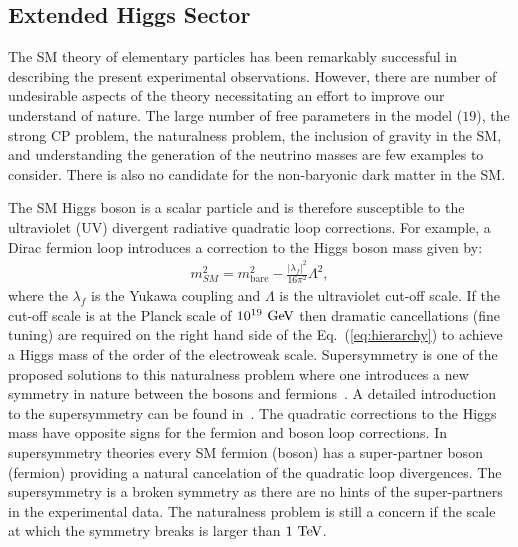 \subsection{Extended Higgs Sector}

The SM theory of elementary particles has been remarkably successful in describing the present experimental observations. However, there are number of undesirable aspects of the theory necessitating an effort to improve our understand of nature. The large number of free parameters in the model ($19$), the strong CP problem, the naturalness problem, the inclusion of gravity in the SM, and understanding the generation of the neutrino masses are few examples to consider. There is also no candidate for the non-baryonic dark matter in the SM. 

The SM Higgs boson is a scalar particle and is therefore susceptible to the ultraviolet (UV) divergent radiative quadratic loop corrections. For example, a Dirac fermion loop introduces a correction to the Higgs boson mass given by:
\begin{eqnarray} \label{eq:hierarchy}
m^{2}_{SM} = m^2_{\mathrm{bare}} - \frac{|\lambda_f|^2}{16\pi^2} \Lambda^2, 
\end{eqnarray}
where the $\lambda_f$ is the Yukawa coupling and $\Lambda$ is the ultraviolet cut-off scale. If the cut-off scale is at the Planck scale of $10^{19}~\mathrm{Ge\kern -0.1em V}$  then dramatic cancellations (fine tuning) are required on the right hand side of the Eq.~(\ref{eq:hierarchy}) to achieve a Higgs mass of the order of the electroweak scale. Supersymmetry is one of the proposed solutions to this naturalness problem where one introduces a new symmetry in nature between the bosons and fermions~\cite{Golfand:1971iw,Wess:1974tw}. A detailed introduction to the supersymmetry can be found in~\cite{Martin:1997ns}. The quadratic corrections to the Higgs mass have opposite signs for the fermion and boson loop corrections. In supersymmetry theories every SM fermion (boson) has a super-partner boson (fermion) providing a natural cancelation of the quadratic loop divergences. The supersymmetry is a broken symmetry as there are no hints of the super-partners in the experimental data. The naturalness problem is still a concern if the scale at which the symmetry breaks is larger than $1~\mathrm{Te\kern -0.1em V}$.  

